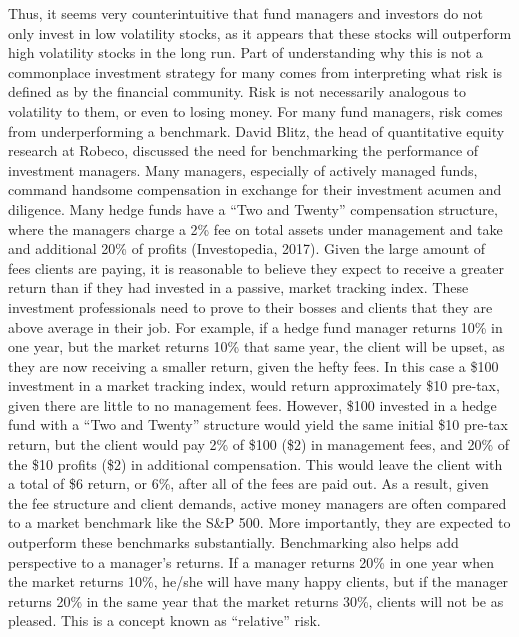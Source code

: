 \documentclass[12pt,twoside]{reedthesis}
\theoremstyle{definition}
\theoremstyle{definition}
\theoremstyle{definition}
\theoremstyle{remark}
\begin{document}
Thus, it seems very counterintuitive that fund managers and investors do
not only invest in low volatility stocks, as it appears that these
stocks will outperform high volatility stocks in the long run. Part of
understanding why this is not a commonplace investment strategy for many
comes from interpreting what risk is defined as by the financial
community. Risk is not necessarily analogous to volatility to them, or
even to losing money. For many fund managers, risk comes from
underperforming a benchmark. David Blitz, the head of quantitative
equity research at Robeco, discussed the need for benchmarking the
performance of investment managers. Many managers, especially of
actively managed funds, command handsome compensation in exchange for
their investment acumen and diligence. Many hedge funds have a ``Two and
Twenty'' compensation structure, where the managers charge a 2\% fee on
total assets under management and take and additional 20\% of profits
(Investopedia, 2017). Given the large amount of fees clients are paying,
it is reasonable to believe they expect to receive a greater return than
if they had invested in a passive, market tracking index. These
investment professionals need to prove to their bosses and clients that
they are above average in their job. For example, if a hedge fund
manager returns 10\% in one year, but the market returns 10\% that same
year, the client will be upset, as they are now receiving a smaller
return, given the hefty fees. In this case a \$100 investment in a
market tracking index, would return approximately \$10 pre-tax, given
there are little to no management fees. However, \$100 invested in a
hedge fund with a ``Two and Twenty'' structure would yield the same
initial \$10 pre-tax return, but the client would pay 2\% of \$100 (\$2)
in management fees, and 20\% of the \$10 profits (\$2) in additional
compensation. This would leave the client with a total of \$6 return, or
6\%, after all of the fees are paid out. As a result, given the fee
structure and client demands, active money managers are often compared
to a market benchmark like the S\&P 500. More importantly, they are
expected to outperform these benchmarks substantially. Benchmarking also
helps add perspective to a manager's returns. If a manager returns 20\%
in one year when the market returns 10\%, he/she will have many happy
clients, but if the manager returns 20\% in the same year that the
market returns 30\%, clients will not be as pleased. This is a concept
known as ``relative'' risk.
\end{document}
